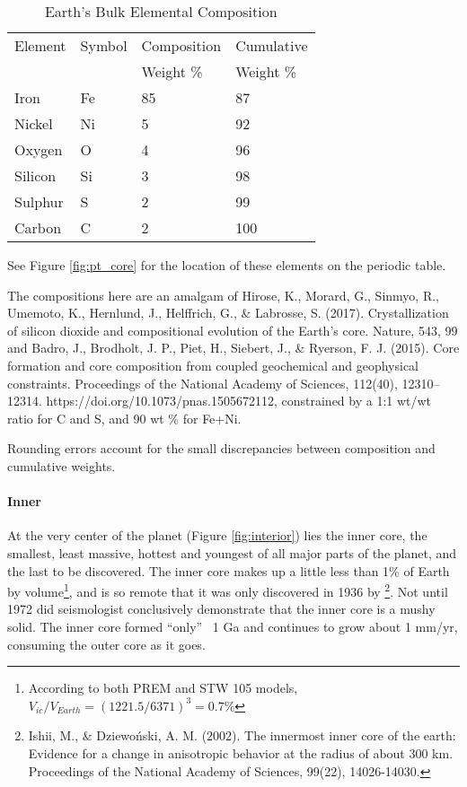 \documentclass[amstex,12pt]{book}
\begin{document}
\begin{table} 
\centering
\begin{threeparttable}
\caption{Earth's Bulk Elemental Composition}
\label{tab:ebc}
\begin{tabular}{@{}llll@{}} \toprule
Element	  &Symbol		&Composition\tnote{2}	&Cumulative\tnote{3}\\
      	  &	        &Weight \%		&Weight \% \\ \midrule
Iron		  &Fe				&85						&87\\
Nickel		&Ni			  &5		  			&92\\
Oxygen		&O		    &4		        &96\\
Silicon		&Si		    &3		        &98\\
Sulphur		&S		    &2	          &99\\
Carbon		&C		    &2	          &100\\ \bottomrule
\end{tabular}
\begin{tablenotes}
\item[1] See Figure \ref{fig:pt_core} for the location of these elements on the periodic table.
\item[2] The compositions here are an amalgam of Hirose, K., Morard, G., Sinmyo, R., Umemoto, K., Hernlund, J., Helffrich, G., \& Labrosse, S. (2017). Crystallization of silicon dioxide and compositional evolution of the Earth’s core. Nature, 543, 99 and Badro, J., Brodholt, J. P., Piet, H., Siebert, J., \& Ryerson, F. J. (2015). Core formation and core composition from coupled geochemical and geophysical constraints. Proceedings of the National Academy of Sciences, 112(40), 12310–12314. https://doi.org/10.1073/pnas.1505672112, constrained by a 1:1 wt/wt ratio for C and S, and 90 wt \% for Fe+Ni.  
\item[3] Rounding errors account for the small discrepancies between composition and cumulative weights. 
\end{tablenotes}
\end{threeparttable}
\end{table}

\paragraph{Inner}
At the very center of the planet (Figure \ref{fig:interior}) lies the inner core, the smallest, least massive, hottest and youngest of all major parts of the planet, and the last to be discovered. The inner core makes up a little less than 1\% of Earth by volume\footnote{According to both PREM and STW 105 models, $V_{ic}/V_{Earth}=(1221.5/6371)^3=0.7\%$}, and is so remote that it was only discovered in 1936 by \footnote{Ishii, M., \& Dziewo\'{n}ski, A. M. (2002). The innermost inner core of the earth: Evidence for a change in anisotropic behavior at the radius of about 300 km. Proceedings of the National Academy of Sciences, 99(22), 14026-14030.}. Not until 1972 did seismologist conclusively demonstrate that the inner core is a mushy solid. The inner core formed “only” ~1 Ga and continues to grow about 1 mm/yr, consuming the outer core as it goes. 
\end{document}
